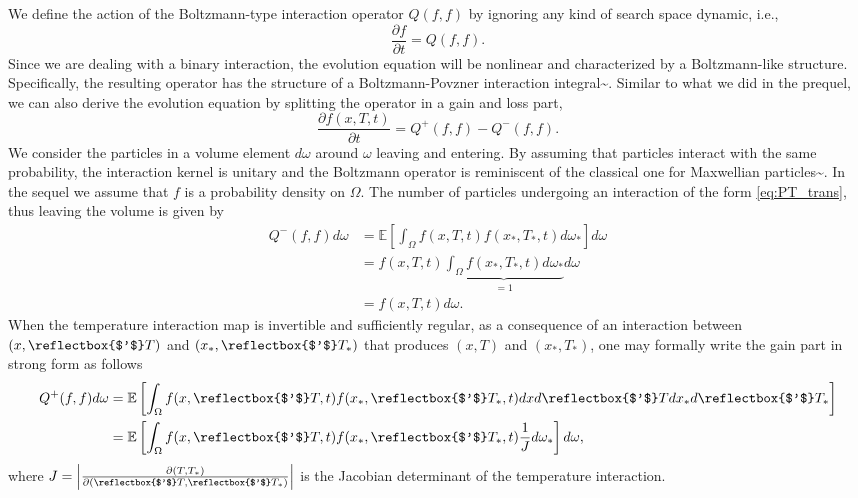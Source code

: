 \documentclass[10pt,a4paper]{article}
\theoremstyle{theorem}
\newcommand{\lp}{\reflectbox{$'$}}
\numberwithin{equation}{section}
\begin{document}
We define the action of the Boltzmann-type interaction operator $Q(f,f)$ by ignoring any kind of search space dynamic, i.e.,
\begin{equation}
\frac{\partial f}{\partial t}=Q(f,f).
\end{equation}
Since we are dealing with a binary interaction, the evolution equation will be nonlinear and characterized by a Boltzmann-like structure. Specifically, the resulting operator has the structure of a Boltzmann-Povzner interaction integral^^>\cite{povzner_boltzmann_1962}. Similar to what we did in the prequel, we can also derive the evolution equation by splitting the operator in a gain and loss part,
\begin{equation}
\label{eq:Qffsplit}
\frac{\partial f(x,T,t)}{\partial t} = Q^+(f,f)-Q^-(f,f).
\end{equation}
We consider the particles in a volume element $d\omega$ around $\omega$ leaving and entering. By assuming that particles interact with the same probability, the interaction kernel is unitary and the Boltzmann operator is reminiscent of the classical one for Maxwellian particles^^>\cite{pareschi_interacting_2014}. In the sequel we assume that $f$ is a probability density on $\Omega$. The number of particles undergoing an interaction of the form \eqref{eq:PT_trans}, thus leaving the volume is given by
\begin{equation}
\label{eq:Qff-}
\begin{split}
Q^-(f,f)d\omega&=\mathbb{E}\left[ \int_{\Omega} f(x,T,t)f(x_*,T_*,t)d\omega_* \right] d\omega\\
&= f(x,T,t)\underbrace{\int_{\Omega} f(x_*,T_*,t)d\omega_*}_{=1}  d\omega\\
&= f(x,T,t)d\omega.
\end{split}
\end{equation}
When the temperature interaction map is invertible and sufficiently regular, as a consequence of an interaction between $(x,\lp T)$ and $(x_*,\lp T_*)$ that produces $(x,T)$ and $(x_*,T_*)$, one may formally write the gain part in strong form as follows
\begin{equation}
\label{eq:Qff+}
\begin{split}
Q^+(f,f)d\omega&=\mathbb{E}\left[ \int_{\Omega}f(x,\lp T,t)f(x_*,\lp T_*,t)dxd\lp Tdx_*d \lp T_* \right]\\
&=\mathbb{E}\left[ \int_{\Omega}f(x,\lp T,t)f(x_*,\lp T_*,t)\frac{1}{J} d\omega_* \right] d\omega,
\end{split}
\end{equation}
where $J=\Big|\frac{\partial(T,T_*)}{\partial(\lp T,\lp T_*)}\Big|$ is the Jacobian determinant of the temperature interaction.
\end{document}
